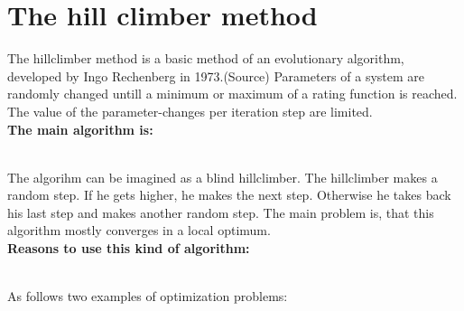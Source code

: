 \documentclass[10pt,a4paper,DIV=11]{scrreprt}
\begin{document}
\section{The hill climber method}
\label{sec:ea}
The hillclimber method is a basic method of an evolutionary algorithm, developed by Ingo Rechenberg in 1973.(Source) %
Parameters of a system are randomly changed untill a minimum or maximum of a rating function is reached. The value of the parameter-changes per iteration step are limited. \\

\textbf{The main algorithm is:}

 \\

The algorihm can be imagined as a blind hillclimber. The hillclimber makes a random step. If he gets higher, he makes the next step. Otherwise he takes back his last step and makes another random step. The main problem is, that this algorithm mostly converges in a local optimum. \\

\textbf{Reasons to use this kind of algorithm:}

   \\

As follows two examples of optimization problems:
\end{document}
